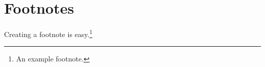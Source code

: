 \documentclass[a4paper,12pt]{article}
\begin{document}
	\section*{Footnotes}
	Creating a footnote is easy.\footnote{An example footnote.}
\end{document}
